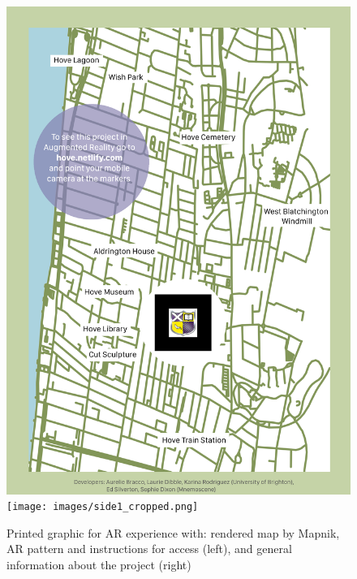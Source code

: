 \documentclass[acmlarge,screen,dvipsnames]{acmart}
\begin{document}



%

 

\newpage \begin{figure}[ht] \centering
\includegraphics[width=0.49\linewidth]{images/side.png}
\texttt{[image: images/side1\_cropped.png]}
\caption{Printed graphic for AR experience with: rendered map by
Mapnik, AR pattern and instructions for access (left), and general information
about the project (right)} \label{fig:print} \end{figure}
\end{document}
